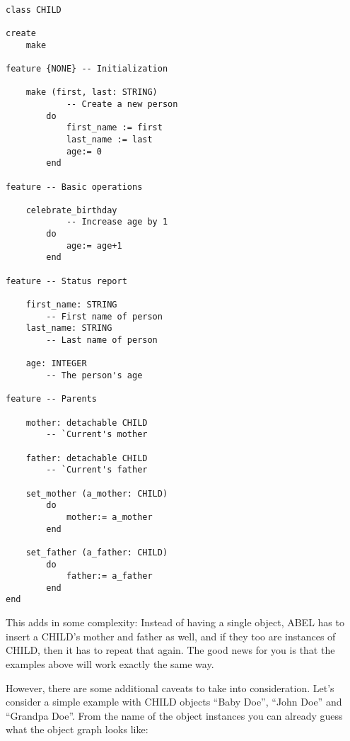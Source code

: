 \begin{lstlisting}[language=OOSC2Eiffel, captionpos=b, caption={The CHILD class}, label={lst:child_class}]

class CHILD

create
	make

feature {NONE} -- Initialization

	make (first, last: STRING)
			-- Create a new person
		do
			first_name := first
			last_name := last
			age:= 0
		end

feature -- Basic operations

	celebrate_birthday
			-- Increase age by 1
		do
			age:= age+1
		end

feature -- Status report

	first_name: STRING
		-- First name of person
	last_name: STRING
		-- Last name of person

	age: INTEGER
		-- The person's age

feature	-- Parents 

	mother: detachable CHILD
		-- `Current's mother

	father: detachable CHILD
		-- `Current's father
	
	set_mother (a_mother: CHILD)
		do
			mother:= a_mother
		end

	set_father (a_father: CHILD)
		do
			father:= a_father
		end
end
\end{lstlisting}


This adds in some complexity: 
Instead of having a single object, ABEL has to insert a CHILD's mother and father as well, and if they too are instances of CHILD, then it has to repeat that again.
The good news for you is that the examples above will work exactly the same way.

However, there are some additional caveats to take into consideration. 
Let's consider a simple example with CHILD objects ``Baby Doe'', ``John Doe'' and ``Grandpa Doe''.
From the name of the object instances you can already guess what the object graph looks like: 

	\begin{center}
	\end{center}

